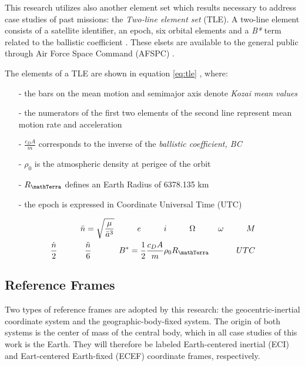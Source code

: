 This research utilizes also another element set which results necessary to address case studies of past missions: the \textit{Two-line element set} (TLE).
A two-line element consists of a satellite identifier, an epoch, six orbital elements and a \textit{B*} term related to the ballistic coefficient \cite{riesing2015orbit}.
These elsets are available to the general public through Air Force Space Command (AFSPC) \cite{vallado2013fundamentals}.

The elements of a TLE are shown in equation \ref{eq:tle} \cite{vallado2013fundamentals}, where:
\begin{itemize}
    \item[-] the bars on  the mean motion and semimajor axis denote \textit{Kozai mean values} 
    \item[-] the numerators of the first two elements of the second line represent mean motion rate and acceleration
    \item[-] $\frac{c_D A}{m}$ corresponds to the inverse of the \textit{ballistic coefficient, BC}
    \item[-] $\rho_0$ is the atmospheric density at perigee of the orbit
    \item[-] $R_\mathTerra$ defines an Earth Radius of 6378.135 km
    \item[-] the epoch is expressed in Coordinate Universal Time (UTC)
\end{itemize}

\begin{equation} \label{eq:tle}
    \begin{split}
        \bar{n}=\sqrt{\frac{\mu}{\bar{a}^{3}}} \;\;\;\;\;\;\;\;\;\; e \;\;\;\;\;\;\;\;\;\; i \;\;\;\;\;\;\;\;\;\; \Omega \;\;\;\;\;\;\;\;\;\; \omega \;\;\;\;\;\;\;\;\;\; M \\
        \frac{\dot{n}}{2} \;\;\;\;\;\;\;\;\;\;\;\; \frac{\ddot{n}}{6} \;\;\;\;\;\;\;\;\;\;\;\; B^* = \frac{1}{2} \frac{c_D A}{m} \rho_0 R_\mathTerra \;\;\;\;\;\;\;\;\;\;\;\; UTC
    \end{split}
\end{equation}


\subsection{Reference Frames}
Two types of reference frames are adopted by this research: the geocentric-inertial coordinate system and the geographic-body-fixed system.
The origin of both systems is the center of mass of the central body, which in all case studies of this work is the Earth.
They will therefore be labeled Earth-centered inertial (ECI) and Eart-centered Earth-fixed (ECEF) coordinate frames, respectively.


